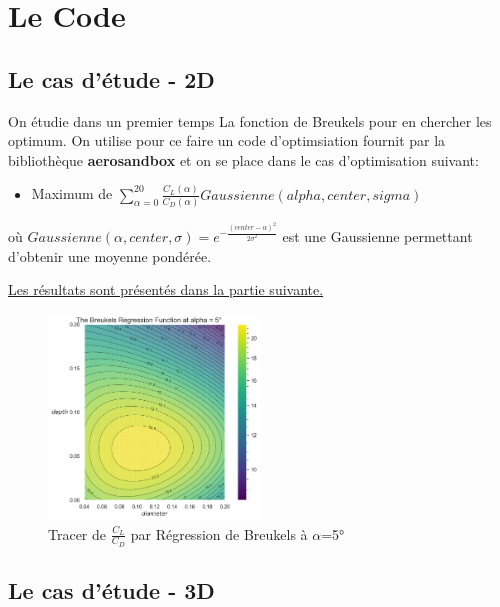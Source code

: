 \IEEEpeerreviewmaketitle
\section{Le Code }
\label{sec:Ch1}

\subsection{Le cas d'étude - 2D} 
\label{sec:Ch1.1}

On étudie dans un premier temps La fonction de Breukels pour en chercher les optimum. On utilise pour ce faire un code d'optimsiation fournit par la bibliothèque \textbf{aerosandbox} et on se place dans le cas d'optimisation suivant: 
\begin{itemize}
    \item Maximum de $\sum_{\alpha = 0}^{20}\frac{C_L(\alpha)}{C_D(\alpha)} Gaussienne(alpha, center, sigma) $
\end{itemize}

    où $Gaussienne(\alpha, center, \sigma) = e^{-\frac{(center - \alpha)^2}{2\sigma^2}}$ est une Gaussienne permettant d'obtenir une moyenne pondérée. 

\underline{Les résultats sont présentés dans la partie suivante.}
\begin{figure}[H]
    \centering
    \includegraphics[width=0.5\textwidth]{Pics/breukels.png}  
    \caption{Tracer de $\frac{C_L}{C_D}$ par Régression de Breukels à $\alpha$=5°}
    \label{fig:breukels}
\end{figure}

\subsection{Le cas d'étude - 3D} 
\label{sec:Ch1.2}

